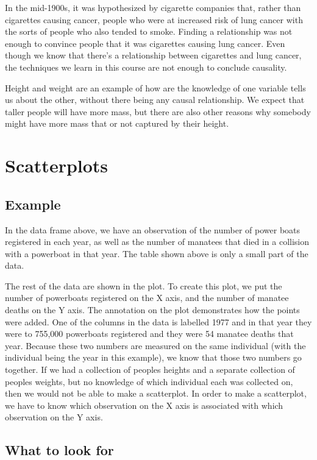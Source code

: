 \documentclass[
  letterpaper,
  DIV=11,
  numbers=noendperiod]{scrreprt}
\begin{document}
In the mid-1900s, it was hypothesized by cigarette companies that,
rather than cigarettes causing cancer, people who were at increased risk
of lung cancer with the sorts of people who also tended to smoke.
Finding a relationship was not enough to convince people that it was
cigarettes causing lung cancer. Even though we know that there's a
relationship between cigarettes and lung cancer, the techniques we learn
in this course are not enough to conclude causality.

Height and weight are an example of how are the knowledge of one
variable tells us about the other, without there being any causal
relationship. We expect that taller people will have more mass, but
there are also other reasons why somebody might have more mass that or
not captured by their height.

\hypertarget{scatterplots}{%
\section{Scatterplots}\label{scatterplots}}

\hypertarget{example}{%
\subsection{Example}\label{example}}

In the data frame above, we have an observation of the number of power
boats registered in each year, as well as the number of manatees that
died in a collision with a powerboat in that year. The table shown above
is only a small part of the data.

The rest of the data are shown in the plot. To create this plot, we put
the number of powerboats registered on the X axis, and the number of
manatee deaths on the Y axis. The annotation on the plot demonstrates
how the points were added. One of the columns in the data is labelled
1977 and in that year they were to 755,000 powerboats registered and
they were 54 manatee deaths that year. Because these two numbers are
measured on the same individual (with the individual being the year in
this example), we know that those two numbers go together. If we had a
collection of peoples heights and a separate collection of peoples
weights, but no knowledge of which individual each was collected on,
then we would not be able to make a scatterplot. In order to make a
scatterplot, we have to know which observation on the X axis is
associated with which observation on the Y axis.

\hypertarget{what-to-look-for}{%
\subsection{What to look for}\label{what-to-look-for}}
\end{document}
